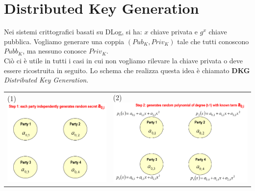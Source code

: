 \documentclass{book}
\begin{document}
\section{Distributed Key Generation}
Nei sistemi crittografici basati su DLog, si ha: \(x\) chiave privata e \(g^{x}\) chiave pubblica\@. Vogliamo generare una coppia \((Pub_{K},Priv_{K})\) tale che tutti conoscono \(Pubb_{K}\), ma nessuno conosce \(Priv_{K}\).\\ Ciò ci è utile in tutti i casi in cui non vogliamo rilevare la chiave privata o deve essere ricostruita in seguito\@.\newline
Lo schema che realizza questa idea è chiamato \textbf{DKG} \emph{Distributed Key Generation}\@.\newline
\begin{tabularx}{0.99\textwidth}{X X}
    (1)\includegraphics[scale=0.4]{2022-01-02-15-56-05.png}%
     &
    (2)\includegraphics[scale=0.4]{2022-01-02-15-59-26.png}%

\end{tabularx}
\end{document}
